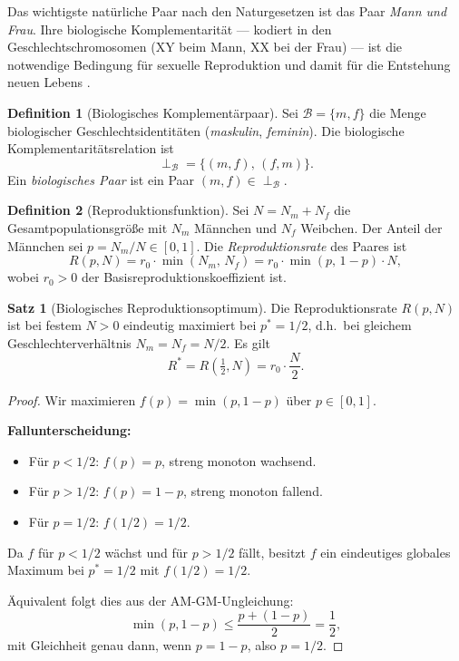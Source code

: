 ﻿\documentclass[a4paper,12pt]{article}
\theoremstyle{definition}
\newtheorem{definition}{Definition}
\newtheorem{satz}{Satz}
\begin{document}
Das wichtigste natürliche Paar nach den Naturgesetzen ist das Paar \emph{Mann und Frau}.
Ihre biologische Komplementarität --- kodiert in den Geschlechtschromosomen (XY beim Mann,
XX bei der Frau) --- ist die notwendige Bedingung für sexuelle Reproduktion und damit für
die Entstehung neuen Lebens \cite{alberts2015,mayr1963}.

\begin{definition}[Biologisches Komplementärpaar]
	Sei $\mathcal{B} = \{m, f\}$ die Menge biologischer Geschlechtsidentitäten
	(\emph{maskulin}, \emph{feminin}).
	Die biologische Komplementaritätsrelation ist
	\[
		\perp_{\mathcal{B}} = \{(m, f),\, (f, m)\}.
	\]
	Ein \emph{biologisches Paar} ist ein Paar $(m, f) \in \perp_{\mathcal{B}}$.
\end{definition}

\begin{definition}[Reproduktionsfunktion]
	Sei $N = N_m + N_f$ die Gesamtpopulationsgröße mit $N_m$ Männchen und $N_f$ Weibchen.
	Der Anteil der Männchen sei $p = N_m / N \in [0,1]$.
	Die \emph{Reproduktionsrate} des Paares ist
	\[
		R(p, N) = r_0 \cdot \min(N_m,\, N_f) = r_0 \cdot \min(p,\, 1-p) \cdot N,
	\]
	wobei $r_0 > 0$ der Basisreproduktionskoeffizient ist.
\end{definition}

\begin{satz}[Biologisches Reproduktionsoptimum]
	\label{satz:repro}
	Die Reproduktionsrate $R(p, N)$ ist bei festem $N > 0$ eindeutig maximiert
	bei $p^* = 1/2$, d.h.\ bei gleichem Geschlechterverhältnis $N_m = N_f = N/2$.
	Es gilt
	\[
		R^* = R\!\left(\tfrac{1}{2}, N\right) = r_0 \cdot \frac{N}{2}.
	\]
\end{satz}

\begin{proof}
	Wir maximieren $f(p) = \min(p, 1-p)$ über $p \in [0,1]$.
	
	\textbf{Fallunterscheidung:}
	\begin{itemize}
		\item Für $p < 1/2$: $f(p) = p$, streng monoton wachsend.
		\item Für $p > 1/2$: $f(p) = 1-p$, streng monoton fallend.
		\item Für $p = 1/2$: $f(1/2) = 1/2$.
	\end{itemize}
	
	Da $f$ für $p < 1/2$ wächst und für $p > 1/2$ fällt, besitzt $f$ ein eindeutiges
	globales Maximum bei $p^* = 1/2$ mit $f(1/2) = 1/2$.
	
	Äquivalent folgt dies aus der AM-GM-Ungleichung:
	\[
		\min(p, 1-p) \leq \frac{p + (1-p)}{2} = \frac{1}{2},
	\]
	mit Gleichheit genau dann, wenn $p = 1-p$, also $p = 1/2$. \qedhere
\end{proof}
\end{document}
